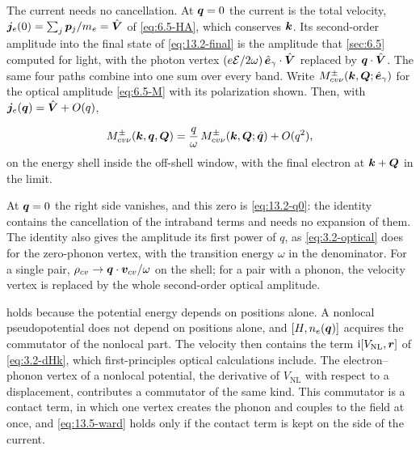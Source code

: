 The current needs no cancellation. At $\bm{q} = 0$ the current is the total velocity, $\bm{j}_e(0) = \sum_j\bm{p}_j/m_e = \hat{\bm{V}}$ of \cref{eq:6.5-HA}, which conserves $\bm{k}$. Its second-order amplitude into the final state of \cref{eq:13.2-final} is the amplitude that \cref{sec:6.5} computed for light, with the photon vertex $(e\mathcal{E}/2\omega)\,\hat{\bm{e}}_\gamma\cdot\hat{\bm{V}}$ replaced by $\bm{q}\cdot\hat{\bm{V}}$. The same four paths combine into one sum over every band. Write $M^\pm_{cv\nu}(\bm{k},\bm{Q};\hat{\bm{e}}_\gamma)$ for the optical amplitude \cref{eq:6.5-M} with its polarization shown. Then, with $\bm{j}_e(\bm{q}) = \hat{\bm{V}} + O(q)$,
\begin{keyresult}
\begin{equation}
  M^\pm_{cv\nu}(\bm{k},\bm{q},\bm{Q}) = \frac{q}{\omega}\,M^\pm_{cv\nu}(\bm{k},\bm{Q};\hat{\bm{q}}) + O(q^2) ,
  \label{eq:13.5-Mlim}
\end{equation}
on the energy shell inside the off-shell window, with the final electron at $\bm{k}+\bm{Q}$ in the limit.
\end{keyresult}
\noindent At $\bm{q} = 0$ the right side vanishes, and this zero is \cref{eq:13.2-q0}: the identity contains the cancellation of the intraband terms and needs no expansion of them. The identity also gives the amplitude its first power of $q$, as \cref{eq:3.2-optical} does for the zero-phonon vertex, with the transition energy $\omega$ in the denominator. For a single pair, $\rho_{cv} \to \bm{q}\cdot\bm{v}_{cv}/\omega$ on the shell; for a pair with a phonon, the velocity vertex is replaced by the whole second-order optical amplitude.

 holds because the potential energy depends on positions alone. A nonlocal pseudopotential does not depend on positions alone, and $[H, n_e(\bm{q})]$ acquires the commutator of the nonlocal part. The velocity then contains the term $\mathrm{i}[V_{\mathrm{NL}},\bm{r}]$ of \cref{eq:3.2-dHk}, which first-principles optical calculations include. The electron--phonon vertex of a nonlocal potential, the derivative of $V_{\mathrm{NL}}$ with respect to a displacement, contributes a commutator of the same kind. This commutator is a contact term, in which one vertex creates the phonon and couples to the field at once, and \cref{eq:13.5-ward} holds only if the contact term is kept on the side of the current.

